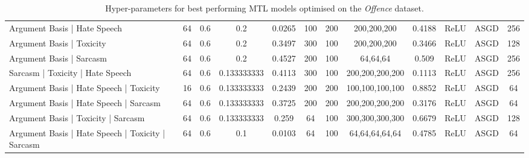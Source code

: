 {\begin{landscape}
\begin{table}[]
{\begin{tabular}{l|ccccccccccc}
      Argument Basis | Hate Speech                      & 64         & 0.6              & 0.2              & 0.0265  & 100           & 200    & 200,200,200     & 0.4188        & ReLU          & ASGD      & 256        \\
      Argument Basis | Toxicity                         & 64         & 0.6              & 0.2              & 0.3497  & 300           & 100    & 200,200,200     & 0.3466        & ReLU          & ASGD      & 128        \\
      Argument Basis | Sarcasm                          & 64         & 0.6              & 0.2              & 0.4527  & 200           & 100    & 64,64,64        & 0.509         & ReLU          & ASGD      & 256        \\
      Sarcasm | Toxicity | Hate Speech                  & 64         & 0.6              & 0.133333333      & 0.4113  & 300           & 100    & 200,200,200,200 & 0.1113        & ReLU          & ASGD      & 256        \\
      Argument Basis | Hate Speech | Toxicity           & 16         & 0.6              & 0.133333333      & 0.2439  & 200           & 200    & 100,100,100,100 & 0.8852        & ReLU          & ASGD      & 64         \\
      Argument Basis | Hate Speech | Sarcasm            & 64         & 0.6              & 0.133333333      & 0.3725  & 200           & 200    & 200,200,200,200 & 0.3176        & ReLU          & ASGD      & 64         \\
      Argument Basis | Toxicity | Sarcasm               & 64         & 0.6              & 0.133333333      & 0.259   & 64            & 100    & 300,300,300,300 & 0.6679        & ReLU          & ASGD      & 128        \\
      Argument Basis | Hate Speech | Toxicity | Sarcasm & 64         & 0.6              & 0.1              & 0.0103  & 64            & 100    & 64,64,64,64,64  & 0.4785        & ReLU          & ASGD      & 64
    \end{tabular}%
    }
    \caption{Hyper-parameters for best performing MTL models optimised on the \textit{Offence} dataset.}
    \label{tab:mtl_params_davidson}
  \end{table}
  \vfill  
  \begin{table}[]
    \centering
\end{table}
\end{landscape}}
